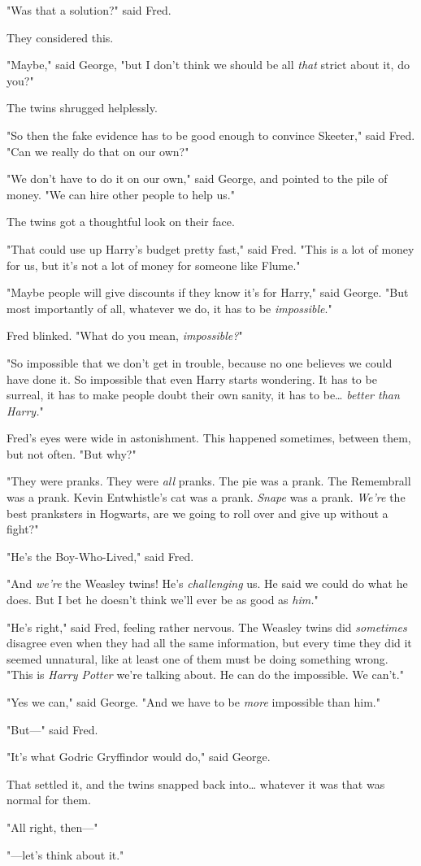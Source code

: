 "Was that a solution?" said Fred.

They considered this.

"Maybe," said George, "but I don't think we should be all \emph{that} strict 
about it, do you?"

The twins shrugged helplessly.

"So then the fake evidence has to be good enough to convince Skeeter," said 
Fred. "Can we really do that on our own?"

"We don't have to do it on our own," said George, and pointed to the pile of 
money. "We can hire other people to help us."

The twins got a thoughtful look on their face.

"That could use up Harry's budget pretty fast," said Fred. "This is a lot of 
money for us, but it's not a lot of money for someone like Flume."

"Maybe people will give discounts if they know it's for Harry," said George. 
"But most importantly of all, whatever we do, it has to be \emph{impossible}."

Fred blinked. "What do you mean, \emph{impossible?}"

"So impossible that we don't get in trouble, because no one believes we could 
have done it. So impossible that even Harry starts wondering. It has to be 
surreal, it has to make people doubt their own sanity, it has to be{\ldots} 
\emph{better than Harry.}"

Fred's eyes were wide in astonishment. This happened sometimes, between them, 
but not often. "But why?"

"They were pranks. They were \emph{all} pranks. The pie was a prank. The 
Remembrall was a prank. Kevin Entwhistle's cat was a prank. \emph{Snape} was a 
prank. \emph{We're} the best pranksters in Hogwarts, are we going to roll over 
and give up without a fight?"

"He's the Boy-Who-Lived," said Fred.

"And \emph{we're} the Weasley twins! He's \emph{challenging} us. He said we 
could do what he does. But I bet he doesn't think we'll ever be as good as 
\emph{him.}"

"He's right," said Fred, feeling rather nervous. The Weasley twins did 
\emph{sometimes} disagree even when they had all the same information, but 
every time they did it seemed unnatural, like at least one of them must be 
doing something wrong. "This is \emph{Harry Potter} we're talking about. He can 
do the impossible. We can't."

"Yes we can," said George. "And we have to be \emph{more} impossible than him."

"But---" said Fred.

"It's what Godric Gryffindor would do," said George.

That settled it, and the twins snapped back into{\ldots} whatever it was that 
was normal for them.

"All right, then---"

"---let's think about it."
